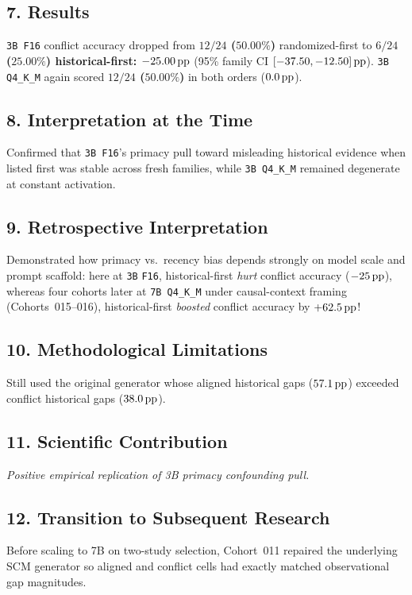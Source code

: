 \subsection*{7. Results}
\texttt{3B F16} conflict accuracy dropped from \textbf{$12/24$ ($50.00\%$)} randomized-first to \textbf{$6/24$ ($25.00\%$)\textbf{ historical-first: }$-25.00\,\mathrm{pp}$} (95\% family CI $[-37.50, -12.50]\,\mathrm{pp}$). \texttt{3B Q4\_K\_M} again scored \textbf{$12/24$ ($50.00\%$)} in both orders ($0.0\,\mathrm{pp}$).

\subsection*{8. Interpretation at the Time}
Confirmed that \texttt{3B F16}'s primacy pull toward misleading historical evidence when listed first was stable across fresh families, while \texttt{3B Q4\_K\_M} remained degenerate at constant activation.

\subsection*{9. Retrospective Interpretation}
Demonstrated how primacy vs.\ recency bias depends strongly on model scale and prompt scaffold: here at \texttt{3B} \texttt{F16}, historical-first \emph{hurt} conflict accuracy ($-25\,\mathrm{pp}$), whereas four cohorts later at \texttt{7B Q4\_K\_M} under causal-context framing (Cohorts~015--016), historical-first \emph{boosted} conflict accuracy by $+62.5\,\mathrm{pp}$!

\subsection*{10. Methodological Limitations}
Still used the original generator whose aligned historical gaps ($57.1\,\mathrm{pp}$) exceeded conflict historical gaps ($38.0\,\mathrm{pp}$).

\subsection*{11. Scientific Contribution}
\emph{Positive empirical replication of 3B primacy confounding pull.}

\subsection*{12. Transition to Subsequent Research}
Before scaling to 7B on two-study selection, Cohort~011 repaired the underlying SCM generator so aligned and conflict cells had exactly matched observational gap magnitudes.

